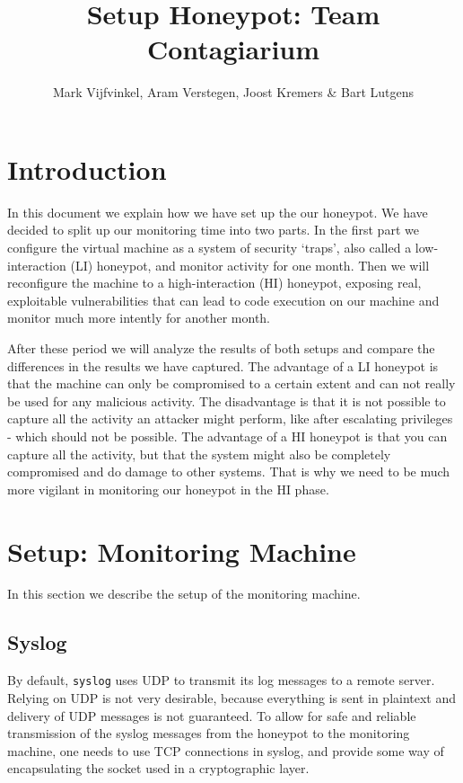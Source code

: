 \documentclass[11pt]{article} %
\title{Setup Honeypot: Team Contagiarium}
\author{Mark Vijfvinkel, Aram Verstegen, Joost Kremers \& Bart Lutgens}
\begin{document}
\maketitle

\section{Introduction}

In this document we explain how we have set up the our honeypot. 
We have decided to split up our monitoring time into two parts.
In the first part we configure the virtual machine as a system of security `traps', also called a low-interaction (LI) honeypot, and monitor activity for one month.
Then we will reconfigure the machine to a high-interaction (HI) honeypot, exposing real, exploitable vulnerabilities that can lead to code execution on our machine and monitor much more intently for another month. 

After these period we will analyze the results of both setups and compare the differences in the results we have captured. 
The advantage of a LI honeypot is that the machine can only be compromised to a certain extent and can not really be used for any malicious activity.
The disadvantage is that it is not possible to capture all the activity an attacker might perform, like after escalating privileges - which should not be possible.
The advantage of a HI honeypot is that you can capture all the activity, but that the system might also be completely compromised and do damage to other systems.
That is why we need to be much more vigilant in monitoring our honeypot in the HI phase.

\section{Setup: Monitoring Machine}

In this section we describe the setup of the monitoring machine.

\subsection{Syslog}
By default, \verb|syslog| uses UDP to transmit its log messages to a remote server.
Relying on UDP is not very desirable, because everything is sent in plaintext and delivery of UDP messages is not guaranteed.
To allow for safe and reliable transmission of the syslog messages from the honeypot to the monitoring machine, one needs to use TCP connections in syslog, and provide some way of encapsulating the socket used in a cryptographic layer.
\end{document}

